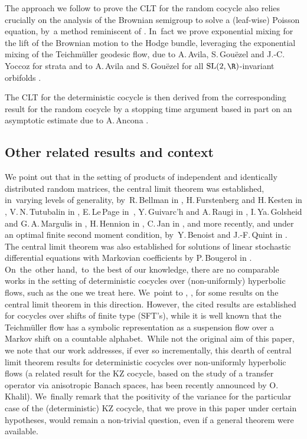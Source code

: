 \documentclass[JEP,XML,SOM,Unicode,published]{cedram}
\theoremstyle{plain}
\theoremstyle{definition}
\numberwithin{equation}{subsection}
\newcommand{\SL}{\mathrm{SL}}
\newcommand{\Tm}{Teichmüller\xspace}
\begin{document}
The approach we follow to prove the CLT for the random cocycle also relies crucially on the analysis of the Brownian semigroup to solve a (leaf-wise) Poisson equation, by~a method reminiscent of \cite{L95}. In~fact we prove exponential mixing for the lift of the Brownian motion to the Hodge bundle, leveraging the exponential mixing of the \Tm geodesic flow, due to A.\,Avila, S.\,Gouëzel and J.-C.\,Yoccoz for strata \cite{AGY06} and to A.\,Avila and S.\,Gouëzel for all $\SL(2,\R)$-invariant orbifolds \cite{AG13}.

The CLT for the deterministic cocycle is then derived from the corresponding result for the random cocycle by a stopping time argument based in part on an asymptotic estimate due to A.\,Ancona \cite{Anc90}.%

\subsection{Other related results and context} We point out that in the setting of products of independent and identically distributed random matrices, the central limit theorem was established, in~varying levels of generality, by~R.\,Bellman in \cite{B54}, H.\,Furstenberg and H.\,Kesten in \cite{FK60}, V.\,N.\,Tutubalin in \cite{T77}, E.\,Le\,Page in~\cite{LP82}, Y.\,Guivarc'h and A.\,Raugi in \cite{GR85}, I.\,Ya.\,Golsheid and G.\,A.\,Margulis in \cite{GM89}, H.\,Hennion in \cite{H97}, C.\,Jan in \cite{J00}, and more recently, and under an optimal finite second moment condition, by~Y.\,Benoist and J.-F.\,Quint in \cite{BQ16}. The central limit theorem was also established for solutions of linear stochastic differential equations with Markovian coefficients by P.\,Bougerol in \cite{B88}. On~the~other hand,~to~the best of our knowledge, there are no comparable works in the setting of deterministic cocycles over (non-uniformly) hyperbolic flows, such as the one we treat here. We~point to \cite{DKP21}, \cite{FK21}, \cite{PP22} for some results on the central limit theorem in this direction. However, the cited results are established for cocycles over shifts of finite type (SFT's), while it is well known that the Teichmüller flow has a symbolic representation as a suspension flow over a Markov shift on a countable alphabet.~While not the original aim of this paper, we note that our work addresses, if ever so incrementally, this dearth of central limit theorem results for deterministic cocycles over non-uniformly hyperbolic flows (a related result for the KZ cocycle, based on the study of a transfer operator via anisotropic Banach spaces, has been recently announ\-ced by O.\,Khalil). We~finally remark that the positivity of the variance for the particular case of the (deterministic) KZ cocycle, that we prove in this paper under certain hypotheses, would remain a non-trivial question, even if a general theorem were available.
\end{document}
